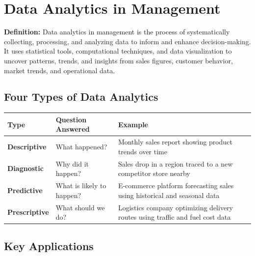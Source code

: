 \documentclass[11pt, letterpaper]{article}
\begin{document}
\section{Data Analytics in Management}

\begin{defbox}
\textbf{Definition:} Data analytics in management is the process of systematically collecting, processing, and analyzing data to inform and enhance decision-making. It uses statistical tools, computational techniques, and data visualization to uncover patterns, trends, and insights from sales figures, customer behavior, market trends, and operational data.
\end{defbox}

\subsection{Four Types of Data Analytics}

\begin{center}
\begin{tabular}{>{\bfseries}p{3.5cm} p{3cm} p{6cm}}
\toprule
Type & Question Answered & Example \\
\midrule
Descriptive & What happened? & Monthly sales report showing product trends over time \\
\addlinespace
Diagnostic & Why did it happen? & Sales drop in a region traced to a new competitor store nearby \\
\addlinespace
Predictive & What is likely to happen? & E-commerce platform forecasting sales using historical and seasonal data \\
\addlinespace
Prescriptive & What should we do? & Logistics company optimizing delivery routes using traffic and fuel cost data \\
\bottomrule
\end{tabular}
\end{center}

\subsection{Key Applications}
\end{document}
